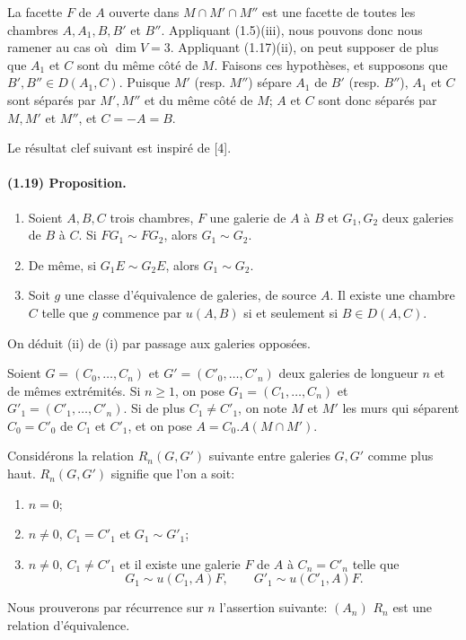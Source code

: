 \documentclass[10pt]{article}
\begin{document}
La facette $F$ de $A$ ouverte dans $M\cap M'\cap M''$ est une facette de toutes les chambres $A,A_1,B,B'$ et $B''$. Appliquant (1.5)(iii), nous pouvons donc nous ramener au cas où $\dim V=3$. Appliquant (1.17)(ii), on peut supposer de plus que $A_1$ et $C$ sont du même côté de $M$. Faisons ces hypothèses, et supposons que $B',B''\in D(A_1,C)$. Puisque $M'$ (resp. $M''$) sépare $A_1$ de $B'$ (resp. $B''$), $A_1$ et $C$ sont séparés par $M',M''$ et du même côté de $M$; $A$ et $C$ sont donc séparés par $M,M'$ et $M''$, et $C=-A=B$.

Le résultat clef suivant est inspiré de [4].

\paragraph{(1.19) Proposition.} \begin{enumerate}[label=(\roman*)]
\item Soient $A,B,C$ trois chambres, $F$ une galerie de $A$ à $B$ et $G_1,G_2$ deux galeries de $B$ à $C$. Si $FG_1\sim FG_2$, alors $G_1\sim G_2$.
\item De même, si $G_1E\sim G_2E$, alors $G_1\sim G_2$.
\item Soit $g$ une classe d'équivalence de galeries, de source $A$. Il existe une chambre $C$ telle que $g$ commence par $u(A,B)$ si et seulement si $B\in D(A,C)$.
\end{enumerate}
On déduit (ii) de (i) par passage aux galeries opposées.

Soient $G=(C_0,\ldots,C_n)$ et $G'=(C'_0,\ldots,C'_n)$ deux galeries de longueur $n$ et de mêmes extrémités. Si $n\ge1$, on pose $G_1=(C_1,\ldots,C_n)$ et $G'_1=(C'_1,\ldots,C'_n)$. Si de plus $C_1\ne C'_1$, on note $M$ et $M'$ les murs qui séparent $C_0=C'_0$ de $C_1$ et $C'_1$, et on pose $A=C_0.A(M\cap M')$.

Considérons la relation $R_n(G,G')$ suivante entre galeries $G,G'$ comme plus haut. $R_n(G,G')$ signifie que l'on a soit:
\begin{enumerate}[label=\alph*)]
\item $n=0$;
\item $n\ne0$, $C_1=C'_1$ et $G_1\sim G'_1$;
\item $n\ne0$, $C_1\ne C'_1$ et il existe une galerie $F$ de $A$ à $C_n=C'_n$ telle que
\[
G_1\sim u(C_1,A)F,\qquad G'_1\sim u(C'_1,A)F.
\]
\end{enumerate}
Nous prouverons par récurrence sur $n$ l'assertion suivante: $(A_n)$ $R_n$ est une relation d'équivalence.
\end{document}
